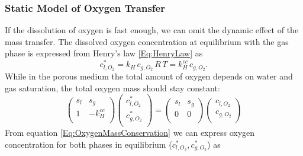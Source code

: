 \documentclass[a4paper,12pt]{article}
\newcommand{\Sl}{\mbox{$s_l\xspace$}}
\newcommand{\Sg}{\mbox{$s_g\xspace$}}
\newcommand{\coxyw}{\mbox{$c_{l,O_2}\xspace$}}
\newcommand{\coxyg}{\mbox{$c_{g,O_2}\xspace$}}
\newcommand{\coxys}{\mbox{$c^*_{l,O_2}\xspace$}}
\newcommand{\coxysg}{\mbox{$c^*_{g,O_2}\xspace$}}
\newcommand{\kh}{\mbox{$k_H\xspace$}}
\newcommand{\khcc}{\mbox{$k_{H}^{cc}\xspace$}}
\begin{document}
\subsubsection*{Static Model of Oxygen Transfer}
If the dissolution of oxygen is fast enough, we can omit the dynamic
effect of the mass transfer. The dissolved oxygen concentration at equilibrium
with the gas phase is expressed from Henry's law \eqref{Eq:HenryLaw}
as
\begin{equation} \label{Eq:OxygenEquilibrium} \coxys = \kh \, \coxyg
\,R \,T = \khcc \, \coxyg .
\end{equation}
While in the porous medium the total amount of oxygen depends on water
and gas saturation, the total oxygen mass should stay constant:
\begin{equation}\label{Eq:OxygenMassConservation}
  \begin{pmatrix}
    \Sl & \Sg \\
    1 & -\khcc\\
  \end{pmatrix}
  \begin{pmatrix}
    \coxys \\
    \coxysg \\
  \end{pmatrix}
  =
  \begin{pmatrix}
    \Sl & \Sg \\
    0 & 0\\
  \end{pmatrix}
  \begin{pmatrix}
    \coxyw \\
    \coxyg  \\
  \end{pmatrix}
\end{equation}
From equation \eqref{Eq:OxygenMassConservation} we can express oxygen
concentration for both phases in equilibrium ($\coxys, \coxysg$) as
\end{document}
